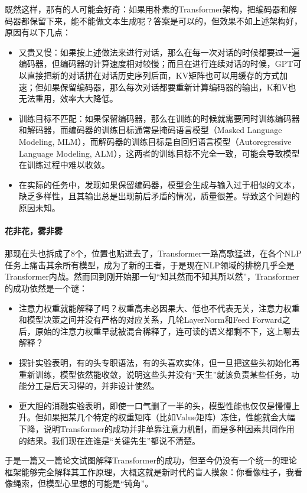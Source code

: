 既然这样，那有的人可能会好奇：如果用朴素的Transformer架构，把编码器和解码器都保留下来，能不能做文本生成呢？答案是可以的，但效果不如上述架构好，原因有以下几点：
\begin{itemize}
    \item 又贵又慢：如果按上述做法来进行对话，那么在每一次对话的时候都要过一遍编码器，但编码器的计算速度相对较慢；而且在进行连续对话的时候，GPT可以直接把新的对话拼在对话历史序列后面，KV矩阵也可以用缓存的方式加速；但如果保留编码器，那么每次对话都要重新计算编码器的输出，K和V也无法重用，效率大大降低。
    \item 训练目标不匹配：如果保留编码器，那么在训练的时候就需要同时训练编码器和解码器，而编码器的训练目标通常是掩码语言模型（Masked Language Modeling, MLM），而解码器的训练目标是自回归语言模型（Autoregressive Language Modeling, ALM），这两者的训练目标不完全一致，可能会导致模型在训练过程中难以收敛。
    \item 在实际的任务中，发现如果保留编码器，模型会生成与输入过于相似的文本，缺乏多样性，且其输出总是出现前后矛盾的情况，质量很差。导致这个问题的原因未知。
\end{itemize}

\paragraph{花非花，雾非雾}

那现在头也拆成了8个，位置也贴进去了，Transformer一路高歌猛进，在各个NLP任务上痛击其余所有模型，成为了新的王者，于是现在NLP领域的排榜几乎全是Transformer内战。然而回到刚开始那一句“知其然而不知其所以然”，Transformer的成功依然是一个谜：
\begin{itemize}
    \item 注意力权重就能解释了吗？权重高未必因果大、低也不代表无关，注意力权重和模型决策之间并没有严格的对应关系，几轮LayerNorm和Feed Forward之后，原始的注意力权重早就被混合稀释了，连可读的语义都剩不下，这上哪去解释？
    \item 探针实验表明，有的头专职语法，有的头喜欢实体，但一旦把这些头初始化再重新训练，模型依然能收敛，说明这些头并没有“天生”就该负责某些任务，功能分工是后天习得的，并非设计使然。
    \item 更大胆的消融实验表明，即使一口气删了一半的头，模型性能也仅仅是慢慢上升。但如果把某几个特定的权重矩阵（比如Value矩阵）冻住，性能就会大幅下降，说明Transformer的成功并非单靠注意力机制，而是多种因素共同作用的结果。我们现在连谁是“关键先生”都说不清楚。
\end{itemize}
于是一篇又一篇论文试图解释Transformer的成功，但至今仍没有一个统一的理论框架能够完全解释其工作原理，大概这就是新时代的盲人摸象：你看像柱子，我看像绳索，但模型心里想的可能是“钝角”。

